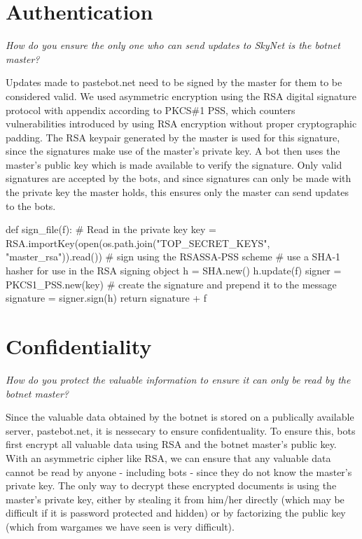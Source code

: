 \documentclass[9pt,a4paper]{article}
\begin{document}
\maketitle
\small
\setlength{\parindent}{0pt}

\section{Authentication}
\emph{How do you ensure the only one who can send updates to SkyNet is the botnet master?}

Updates made to pastebot.net need to be signed by the master for them to be considered valid. We used asymmetric encryption using the RSA digital signature protocol with appendix according to PKCS\#1 PSS, which counters vulnerabilities introduced by using RSA encryption without proper cryptographic padding. The RSA keypair generated by the master is used for this signature, since the signatures make use of the master's private key. A bot then uses the master's public key which is made available to verify the signature. Only valid signatures are accepted by the bots, and since signatures can only be made with the private key the master holds, this ensures only the master can send updates to the bots.

\begin{center}
\vspace{-2ex}
\begin{python}
def sign_file(f):    
    # Read in the private key
    key = RSA.importKey(open(os.path.join("TOP_SECRET_KEYS", "master_rsa")).read())
    # sign using the RSASSA-PSS scheme
    # use a SHA-1 hasher for use in the RSA signing object
    h = SHA.new()
    h.update(f)
    signer = PKCS1_PSS.new(key)
    # create the signature and prepend it to the message
    signature = signer.sign(h)
    return signature + f
\end{python}
\end{center}

\section{Confidentiality}
\emph{How do you protect the valuable information to ensure it can only  be read by the botnet master?}

Since the valuable data obtained by the botnet is stored on a publically available server, pastebot.net, it is nessecary to ensure confidentuality. To ensure this, bots first encrypt all valuable data using RSA and the botnet master's public key. With an asymmetric cipher like RSA, we can ensure that any valuable data cannot be read by anyone - including bots - since they do not know the master's private key. The only way to decrypt these encrypted documents is using the master's private key, either by stealing it from him/her directly (which may be difficult if it is password protected and hidden) or by factorizing the public key (which from wargames we have seen is very difficult).
\end{document}
